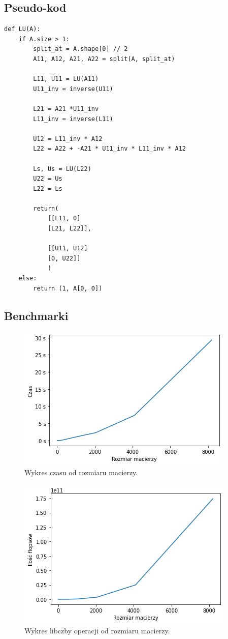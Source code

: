 \documentclass{article}
\begin{document}
\subsection{Pseudo-kod}
\begin{lstlisting}
def LU(A):
    if A.size > 1:
        split_at = A.shape[0] // 2
        A11, A12, A21, A22 = split(A, split_at)

        L11, U11 = LU(A11)
        U11_inv = inverse(U11)

        L21 = A21 *U11_inv
        L11_inv = inverse(L11)

        U12 = L11_inv * A12
        L22 = A22 + -A21 * U11_inv * L11_inv * A12

        Ls, Us = LU(L22)
        U22 = Us
        L22 = Ls

        return(
            [[L11, 0]
            [L21, L22]],
            
            [[U11, U12]
            [0, U22]]
            )
    else:
        return (1, A[0, 0])
\end{lstlisting}
\subsection{Benchmarki}


\begin{figure}[H]
    \centering
  \includegraphics[width=0.6\linewidth]{img/lu_time.png}
  \caption{Wykres czasu od rozmiaru macierzy.}
\end{figure}

\begin{figure}[H]
    \centering
  \includegraphics[width=0.6\linewidth]{img/lu_flops.png}
  \caption{Wykres libczby operacji od rozmiaru macierzy.}
\end{figure}
\end{document}
